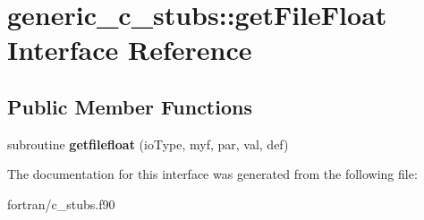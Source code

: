 \hypertarget{interfacegeneric__c__stubs_1_1get_file_float}{}\section{generic\+\_\+c\+\_\+stubs\+:\+:get\+File\+Float Interface Reference}
\label{interfacegeneric__c__stubs_1_1get_file_float}
\subsection*{Public Member Functions}
\begin{DoxyCompactItemize}
\item 
\mbox{\label{interfacegeneric__c__stubs_1_1get_file_float_aebe739a2e89f23287868c520774ddf2b}} 
subroutine {\bfseries getfilefloat} (io\+Type, myf, par, val, def)
\end{DoxyCompactItemize}


The documentation for this interface was generated from the following file\+:\begin{DoxyCompactItemize}
\item 
fortran/c\+\_\+stubs.\+f90\end{DoxyCompactItemize}
